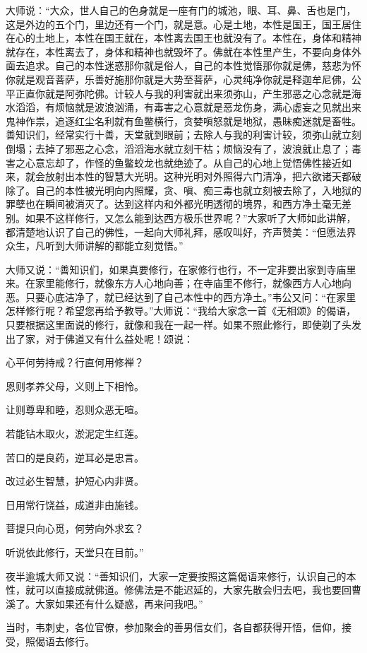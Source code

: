 \documentclass[12pt,twoside,openany]{book}
\newcommand{\kai}[1]{{\CJKfamily{kai}#1}}
\begin{document}
\kai{大师说：“大众，世人自己的色身就是一座有门的城池，眼、耳、鼻、舌也是门，这是外边的五个门，里边还有一个门，就是意。心是土地，本性是国王，国王居住在心的土地上，本性在国王就在，本性离去国王也就没有了。本性在，身体和精神就存在，本性离去了，身体和精神也就毁坏了。佛就在本性里产生，不要向身体外面去追求。自己的本性迷惑那你就是俗人，自己的本性觉悟那你就是佛，慈悲为怀你就是观音菩萨，乐善好施那你就是大势至菩萨，心灵纯净你就是释迦牟尼佛，公平正直你就是阿弥陀佛。计较人与我的利害就出来须弥山，产生邪恶之心念就是海水滔滔，有烦恼就是波浪汹涌，有毒害之心意就是恶龙伤身，满心虚妄之见就出来鬼神作祟，追逐红尘名利就有鱼鳖横行，贪婪嗔怒就是地狱，愚昧痴迷就是畜牲。善知识们，经常实行十善，天堂就到眼前；去除人与我的利害计较，须弥山就立刻倒塌；去掉了邪恶之心念，滔滔海水就立刻干枯；烦恼没有了，波浪就止息了；毒害之心意忘却了，作怪的鱼鳖蛟龙也就绝迹了。从自己的心地上觉悟佛性接近如来，就会放射出本性的智慧大光明。这种光明对外照得六门清净，把六欲诸天都破除了。自己的本性被光明向内照耀，贪、嗔、痴三毒也就立刻被去除了，入地狱的罪孽也在瞬间被消灭了。达到这样内和外都光明透彻的境界，和西方净土毫无差别。如果不这样修行，又怎么能到达西方极乐世界呢？”大家听了大师如此讲解，都清楚地认识了自己的佛性，一起向大师礼拜，感叹叫好，齐声赞美：“但愿法界众生，凡听到大师讲解的都能立刻觉悟。”
	
大师又说：“善知识们，如果真要修行，在家修行也行，不一定非要出家到寺庙里来。在家里能修行，就像东方人心地向善；在寺庙里不修行，就像西方人心地向恶。只要心底洁净了，就已经达到了自己本性中的西方净土。”韦公又问：“在家里怎样修行呢？希望您再给予教导。”大师说：“我给大家念一首《无相颂》的偈语，只要根据这里面说的修行，就像和我在一起一样。如果不照此修行，即使剃了头发出了家，对于佛道又有什么益处呢！颂说：

心平何劳持戒？行直何用修禅？

恩则孝养父母，义则上下相怜。

让则尊卑和睦，忍则众恶无喧。

若能钻木取火，淤泥定生红莲。

苦口的是良药，逆耳必是忠言。

改过必生智慧，护短心内非贤。

日用常行饶益，成道非由施钱。

菩提只向心觅，何劳向外求玄？

听说依此修行，天堂只在目前。”

夜半逾城大师又说：“善知识们，大家一定要按照这篇偈语来修行，认识自己的本性，就可以直接成就佛道。修佛法是不能迟延的，大家先散会归去吧，我也要回曹溪了。大家如果还有什么疑惑，再来问我吧。”

当时，韦刺史，各位官僚，参加聚会的善男信女们，各自都获得开悟，信仰，接受，照偈语去修行。}
\end{document}
